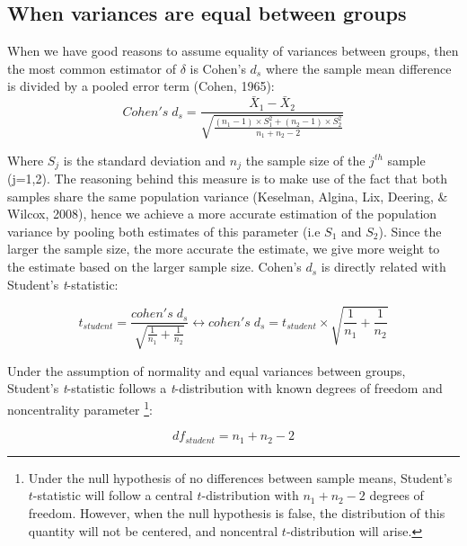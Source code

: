\documentclass[
  man,floatsintext]{apa6}
\begin{document}
\hypertarget{when-variances-are-equal-between-groups}{%
\subsection{When variances are equal between groups}\label{when-variances-are-equal-between-groups}}

When we have good reasons to assume equality of variances between groups, then the most common estimator of \(\delta\) is Cohen's \(d_{s}\) where the sample mean difference is divided by a pooled error term (Cohen, 1965):
\begin{equation} 
Cohen's \; d_s = \frac{\bar{X}_1-\bar{X}_2}{\sqrt{\frac{(n_1-1) \times S_1^2+(n_2-1) \times S_2^2}{n_1+n_2-2}}}
\label{eq:Cohends}
\end{equation}

Where \(S_j\) is the standard deviation and \(n_j\) the sample size of the \(j^{th}\) sample (j=1,2). The reasoning behind this measure is to make use of the fact that both samples share the same population variance (Keselman, Algina, Lix, Deering, \& Wilcox, 2008), hence we achieve a more accurate estimation of the population variance by pooling both estimates of this parameter (i.e \(S_1\) and \(S_2\)). Since the larger the sample size, the more accurate the estimate, we give more weight to the estimate based on the larger sample size. Cohen's \(d_{s}\) is directly related with Student's \emph{t}-statistic:

\begin{equation} 
t_{student}=\frac{cohen's \; d_s}{\sqrt{\frac{1}{n_1}+\frac{1}{n_2}}}\leftrightarrow cohen's \; d_s =  t_{student} \times \sqrt{\frac{1}{n_1}+\frac{1}{n_2}}
\label{eq:Cohenvsstudent}
\end{equation}

Under the assumption of normality and equal variances between groups, Student's \emph{t}-statistic follows a \emph{t}-distribution with known degrees of freedom and noncentrality parameter \footnote{Under the null hypothesis of no differences between sample means, Student's $t$-statistic will follow a central $t$-distribution with $n_1+n_2-2$ degrees of freedom. However, when the null hypothesis is false, the distribution of this quantity will not be centered, and noncentral $t$-distribution will arise.}:

\begin{equation} 
df_{student} = n_1+n_2-2
\label{eq:studentdf}
\end{equation}
\end{document}
